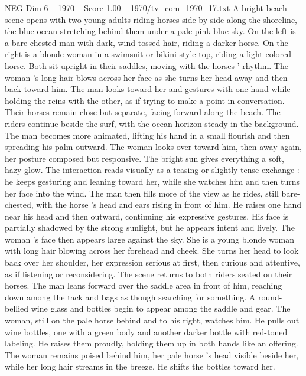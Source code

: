 \begin{textsample}{NEG Dim 6 – 1970 – Score 1.00 – 1970/tv\_com\_1970\_17.txt}  \label{ex:f6_neg_058}
A bright beach scene opens with two young adults riding horses side by side along the shoreline, the blue ocean stretching behind them under a pale pink-blue sky.
On the left is a bare-chested man with dark, wind-tossed hair, riding a darker horse.
On the right is a blonde woman in a swimsuit or bikini-style top, riding a light-colored horse.
Both sit upright in their saddles, moving with the horses ’ rhythm.
The woman ’s long hair blows across her face as she turns her head away and then back toward him.
The man looks toward her and gestures with one hand while holding the reins with the other, as if trying to make a point in conversation.
Their horses remain close but separate, facing forward along the beach.
The riders continue beside the surf, with the ocean horizon steady in the background.
The man becomes more animated, lifting his hand in a small flourish and then spreading his palm outward.
The woman looks over toward him, then away again, her posture composed but responsive.
The bright sun gives everything a soft, hazy glow.
The interaction reads visually as a teasing or slightly tense exchange : he keeps gesturing and leaning toward her, while she watches him and then turns her face into the wind.
The man then fills more of the view as he rides, still bare-chested, with the horse ’s head and ears rising in front of him.
He raises one hand near his head and then outward, continuing his expressive gestures.
His face is partially shadowed by the strong sunlight, but he appears intent and lively.
The woman ’s face then appears large against the sky.
She is a young blonde woman with long hair blowing across her forehead and cheek.
She turns her head to look back over her shoulder, her expression serious at first, then curious and attentive, as if listening or reconsidering.
The scene returns to both riders seated on their horses.
The man leans forward over the saddle area in front of him, reaching down among the tack and bags as though searching for something.
A round-bellied wine glass and bottles begin to appear among the saddle and gear.
The woman, still on the pale horse behind and to his right, watches him.
He pulls out wine bottles, one with a green body and another darker bottle with red-toned labeling.
He raises them proudly, holding them up in both hands like an offering.
The woman remains poised behind him, her pale horse ’s head visible beside her, while her long hair streams in the breeze.
He shifts the bottles toward her.

\end{textsample}
